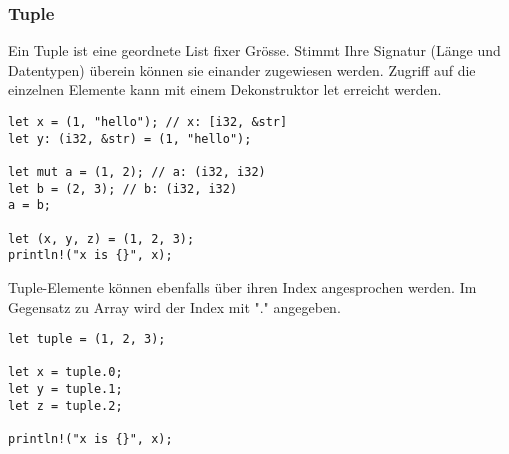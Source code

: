 \subsubsection{Tuple}
Ein Tuple ist eine geordnete List fixer Grösse. Stimmt Ihre Signatur (Länge und Datentypen) überein können sie einander zugewiesen werden.
Zugriff auf die einzelnen Elemente kann mit einem Dekonstruktor let erreicht werden.

\begin{lstlisting}
let x = (1, "hello"); // x: [i32, &str]
let y: (i32, &str) = (1, "hello");

let mut a = (1, 2); // a: (i32, i32)
let b = (2, 3); // b: (i32, i32)
a = b;

let (x, y, z) = (1, 2, 3);
println!("x is {}", x);
\end{lstlisting}

Tuple-Elemente können ebenfalls über ihren Index angesprochen werden. Im Gegensatz zu Array wird der Index mit "." angegeben.

\begin{lstlisting}
let tuple = (1, 2, 3);

let x = tuple.0;
let y = tuple.1;
let z = tuple.2;

println!("x is {}", x);
\end{lstlisting}
